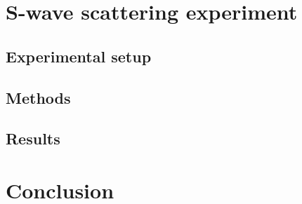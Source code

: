 \documentclass[12pt]{iopart}
\begin{document}
\section{S-wave scattering experiment}
\subsection{Experimental setup}
\subsection{Methods}
\subsection{Results}
\section{Conclusion}
{}

\end{document}
